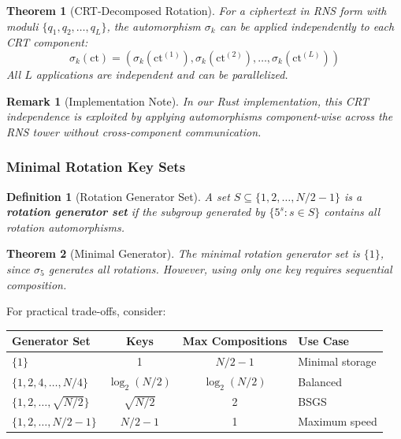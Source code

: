 \documentclass[11pt,a4paper]{article}
\newtheorem{definition}{Definition}
\newtheorem{theorem}{Theorem}
\newtheorem{remark}{Remark}
\begin{document}
\begin{theorem}[CRT-Decomposed Rotation]
For a ciphertext in RNS form with moduli $\{q_1, q_2, \ldots, q_L\}$, the automorphism $\sigma_k$ can be applied independently to each CRT component:
\[
\sigma_k(\text{ct}) = (\sigma_k(\text{ct}^{(1)}), \sigma_k(\text{ct}^{(2)}), \ldots, \sigma_k(\text{ct}^{(L)}))
\]
All $L$ applications are independent and can be parallelized.
\end{theorem}

\begin{remark}[Implementation Note]
In our Rust implementation, this CRT independence is exploited by applying automorphisms component-wise across the RNS tower without cross-component communication.
\end{remark}

\subsubsection{Minimal Rotation Key Sets}

\begin{definition}[Rotation Generator Set]
A set $S \subseteq \{1, 2, \ldots, N/2 - 1\}$ is a \textbf{rotation generator set} if the subgroup generated by $\{5^s : s \in S\}$ contains all rotation automorphisms.
\end{definition}

\begin{theorem}[Minimal Generator]
The minimal rotation generator set is $\{1\}$, since $\sigma_5$ generates all rotations. However, using only one key requires sequential composition.
\end{theorem}

For practical trade-offs, consider:

\begin{center}
\begin{tabular}{lccl}
\toprule
\textbf{Generator Set} & \textbf{Keys} & \textbf{Max Compositions} & \textbf{Use Case} \\
\midrule
$\{1\}$ & 1 & $N/2 - 1$ & Minimal storage \\
$\{1, 2, 4, \ldots, N/4\}$ & $\log_2(N/2)$ & $\log_2(N/2)$ & Balanced \\
$\{1, 2, \ldots, \sqrt{N/2}\}$ & $\sqrt{N/2}$ & 2 & BSGS \\
$\{1, 2, \ldots, N/2-1\}$ & $N/2 - 1$ & 1 & Maximum speed \\
\bottomrule
\end{tabular}
\end{center}
\end{document}
